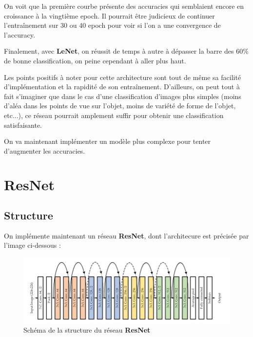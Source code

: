 \documentclass{report}
\begin{document}
On voit que la première courbe présente des accuracies qui semblaient encore en croissance à la vingtième 
epoch. Il pourrait être judicieux de continuer l'entraînement sur 30 ou 40 epoch pour voir si l'on a une 
convergence de l'accuracy.

\vspace{0.3cm}

Finalement, avec \textbf{LeNet}, on réussit de temps à autre à dépasser la barre des 60\% de bonne classification, 
on peine cependant à aller plus haut.

\vspace{0.3cm}

Les points positifs à noter pour cette architecture sont tout de même sa facilité d'implémentation et la 
rapidité de son entraînement. D'ailleurs, on peut tout à fait s'imaginer que dans le cas d'une classification 
d'images plus simples (moins d'aléa dans les points de vue sur l'objet, moins de variété de forme de l'objet, 
etc...), ce réseau pourrait amplement suffir pour obtenir une classification satisfaisante.

\vspace{0.3cm}

On va maintenant implémenter un modèle plus complexe pour tenter d'augmenter les accuracies.


\newpage

\section{ResNet}

\subsection{Structure}

On implémente maintenant un réseau \textbf{ResNet}, dont l'architecure est précisée par l'image ci-dessous : 

\begin{figure}[ht]
    \centering
    \includegraphics[width=\textwidth]{Sources/Reseaux/ResNet_network.jpg}
    \caption{Schéma de la structure du réseau \textbf{ResNet}}
    \label{fig:schema_ResNet}
\end{figure}
\end{document}
